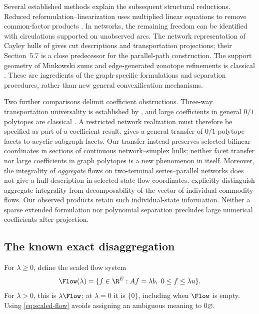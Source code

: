 Several established methods explain the subsequent structural reductions.
Reduced reformulation--linearization uses multiplied linear equations to
remove common-factor products \citep{LibertiPantelides2006}. In networks,
the remaining freedom can be identified with circulations supported on
unobserved arcs. The network representation of Cayley hulls of
\citet{KisHorvath2022} gives cut descriptions and transportation projections;
their Section~5.7 is a close predecessor for the parallel-path construction.
The support geometry of Minkowski sums and edge-generated zonotope
refinements is classical \citep{GritzmannSturmfels1993,OnnRothblum2004}.
These are ingredients of the graph-specific formulations and separation
procedures, rather than new general convexification mechanisms.

Two further comparisons delimit coefficient obstructions. Three-way
transportation universality is established by \citet{DeLoeraOnn2006}, and
large coefficients in general $0/1$ polytopes are classical
\citep{AlonVu1997}. A restricted network realization must therefore be
specified as part of a coefficient result. \citet{Fiorini2006} gives a
general transfer of $0/1$-polytope facets to acyclic-subgraph facets.
Our transfer instead preserves selected bilinear coordinates in sections
of continuous network--simplex hulls; neither facet transfer nor large
coefficients in graph polytopes is a new phenomenon in itself.
Moreover, the integrality of
\emph{aggregate} flows on two-terminal series--parallel networks does not
give a hull description in selected state-flow coordinates.
\citet[Remark~1]{AlmoghrabiSkutellaWarode2026} explicitly distinguish
aggregate integrality from decomposability of the vector of individual
commodity flows. Our observed products retain such individual-state
information. Neither a sparse extended formulation nor polynomial separation
precludes large numerical coefficients after projection.

\subsection{The known exact disaggregation}\label{subsec:disaggregation}
For $\lambda\ge0$, define the scaled flow system
\begin{equation}\label{eq:scaled-flow}
 \Flow(\lambda)=\{f\in\R^E:Af=\lambda b,\ 0\le f\le\lambda u\}.
\end{equation}
For $\lambda>0$, this is $\lambda\Flow$; at $\lambda=0$ it is $\{0\}$,
including when $\Flow$ is empty. Using \eqref{eq:scaled-flow} avoids assigning
an ambiguous meaning to $0\varnothing$.


